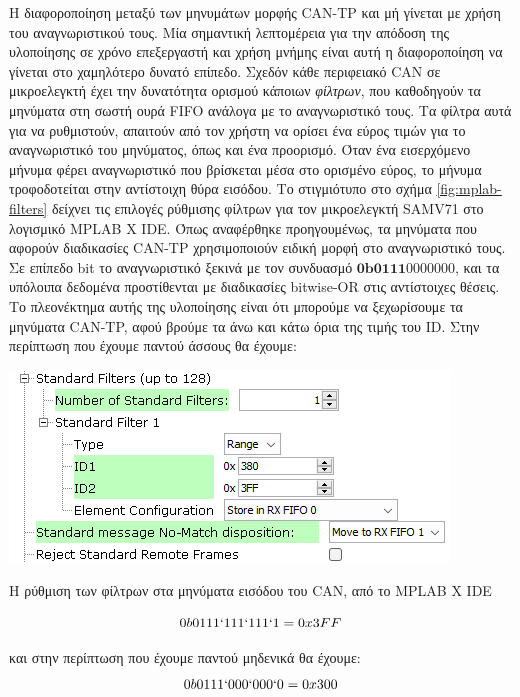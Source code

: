 \documentclass[a4paper,nobib,justified]{tufte-book}
\begin{document}
Η διαφοροποίηση μεταξύ των μηνυμάτων μορφής CAN-TP και μή γίνεται με χρήση του αναγνωριστικού τους. Μία σημαντική λεπτομέρεια για την απόδοση της υλοποίησης σε χρόνο επεξεργαστή και χρήση μνήμης είναι αυτή η διαφοροποίηση να γίνεται στο χαμηλότερο δυνατό επίπεδο. Σχεδόν κάθε περιφειακό CAN σε μικροελεγκτή έχει την δυνατότητα ορισμού κάποιων \textit{φίλτρων}, που καθοδηγούν τα μηνύματα στη σωστή ουρά FIFO ανάλογα με το αναγνωριστικό τους. Τα φίλτρα αυτά για να ρυθμιστούν, απαιτούν από τον χρήστη να ορίσει ένα εύρος τιμών για το αναγνωριστικό του μηνύματος, όπως και ένα προορισμό. Όταν ένα εισερχόμενο μήνυμα φέρει αναγνωριστικό που βρίσκεται μέσα στο ορισμένο εύρος, το μήνυμα τροφοδοτείται στην αντίστοιχη θύρα εισόδου. Το στιγμιότυπο στο σχήμα \ref{fig:mplab-filters} δείχνει τις επιλογές ρύθμισης φίλτρων για τον μικροελεγκτή SAMV71 στο λογισμικό MPLAB X IDE. Όπως αναφέρθηκε προηγουμένως, τα μηνύματα που αφορούν διαδικασίες CAN-TP χρησιμοποιούν ειδική μορφή στο αναγνωριστικό τους. Σε επίπεδο bit το αναγνωριστικό ξεκινά με τον συνδυασμό $\textbf{0b0111}0000000$, και τα υπόλοιπα δεδομένα προστίθενται με διαδικασίες bitwise-OR στις αντίστοιχες θέσεις. Το πλεονέκτημα αυτής της υλοποίησης είναι ότι μπορούμε να ξεχωρίσουμε τα μηνύματα CAN-TP, αφού βρούμε τα άνω και κάτω όρια της τιμής του ID. Στην περίπτωση που έχουμε παντού άσσους θα έχουμε:

\begin{marginfigure}
	\includegraphics[width=\textwidth]{media/images/mplab-filters.png}
	\caption{Η ρύθμιση των φίλτρων στα μηνύματα εισόδου του CAN, από το MPLAB X IDE}
	\label{fig:mplab-filters}
\end{marginfigure}

\begin{equation}
0b0111`111`111`1 = 0x3FF
\end{equation}

και στην περίπτωση που έχουμε παντού μηδενικά θα έχουμε:
\begin{equation}
0b0111`000`000`0 = 0x300
\end{equation}
\end{document}
